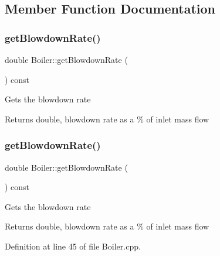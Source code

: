 \subsection{Member Function Documentation}
\mbox{\label{class_boiler_aec9bf6eeed82d8d5f35284c65a3986e7}} 
\subsubsection{\texorpdfstring{get\+Blowdown\+Rate()}{getBlowdownRate()}\hspace{0.1cm}{\footnotesize\ttfamily [1/3]}}
{\footnotesize\ttfamily double Boiler\+::get\+Blowdown\+Rate (\begin{DoxyParamCaption}{ }\end{DoxyParamCaption}) const}

Gets the blowdown rate \begin{DoxyReturn}{Returns}
double, blowdown rate as a \% of inlet mass flow 
\end{DoxyReturn}
\mbox{\label{class_boiler_aec9bf6eeed82d8d5f35284c65a3986e7}} 
\subsubsection{\texorpdfstring{get\+Blowdown\+Rate()}{getBlowdownRate()}\hspace{0.1cm}{\footnotesize\ttfamily [2/3]}}
{\footnotesize\ttfamily double Boiler\+::get\+Blowdown\+Rate (\begin{DoxyParamCaption}{ }\end{DoxyParamCaption}) const}

Gets the blowdown rate \begin{DoxyReturn}{Returns}
double, blowdown rate as a \% of inlet mass flow 
\end{DoxyReturn}


Definition at line 45 of file Boiler.\+cpp.

\mbox{\label{class_boiler_aec9bf6eeed82d8d5f35284c65a3986e7}} 
